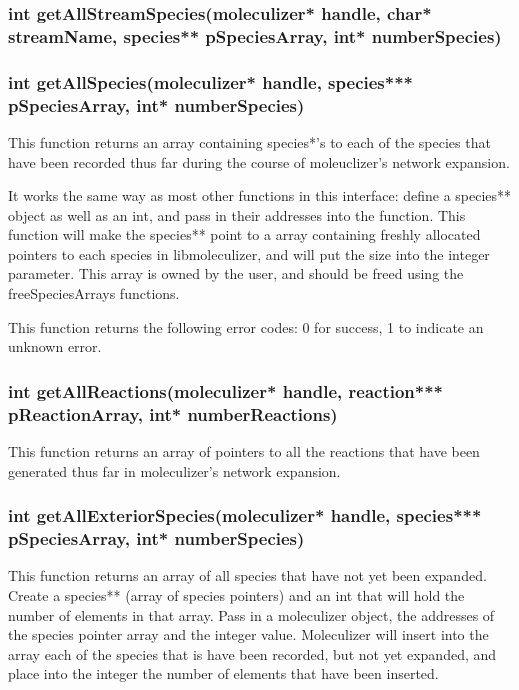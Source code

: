 \subsubsection{int getAllStreamSpecies(moleculizer* handle, char*
  streamName, species** pSpeciesArray, int* numberSpecies)}


\subsubsection{int getAllSpecies(moleculizer* handle, species***
  pSpeciesArray, int* numberSpecies)}

This function returns an array containing species*'s to each of the
species that have been recorded thus far during the course of
moleuclizer's network expansion.  

It works the same way as most other functions in this interface:
define a species** object as well as an int, and pass in their
addresses into the function.  This function will make the species**
point to a array containing freshly allocated pointers to each species
in libmoleculizer, and will put the size into the integer parameter.
This array is owned by the user, and should be freed using the
freeSpeciesArrays functions.

This function returns the following error codes: 0 for success, 1 to
indicate an unknown error.

\subsubsection{int getAllReactions(moleculizer* handle, reaction***
  pReactionArray, int* numberReactions)}

This function returns an array of pointers to all the reactions that
have been generated thus far in moleculizer's network expansion.  


\subsubsection{int getAllExteriorSpecies(moleculizer* handle,
  species*** pSpeciesArray, int* numberSpecies)}

This function returns an array of all species that have not yet been
expanded.  Create a species** (array of species pointers) and an int
that will hold the number of elements in that array.  Pass in a
moleculizer object, the addresses of the species pointer array and the
integer value.  Moleculizer will insert into the array each of the
species that is have been recorded, but not yet expanded, and place
into the integer the number of elements that have been inserted.  

